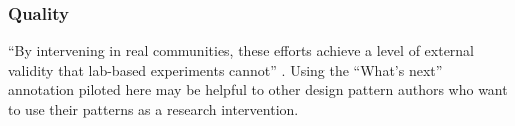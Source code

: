 \vspace{-.25\baselineskip}

\subsubsection*{Quality} 
``By intervening in real communities, these efforts achieve a level of external validity that lab-based experiments cannot'' \cite{benkler2015peer}.  Using the ``What's next'' annotation piloted here may be helpful to other design pattern authors who want to use their patterns as a research intervention.

\vspace{-.25\baselineskip}








